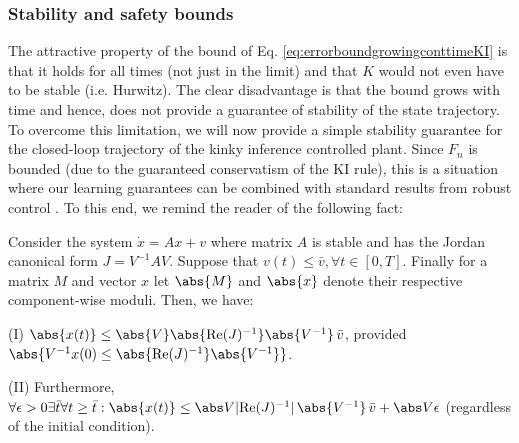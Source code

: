 \subsubsection{Stability and safety bounds}
The attractive property of the bound of Eq. \ref{eq:errorboundgrowingconttimeKI} is that it holds for all times (not just in the limit) and that $K$ would not even have to be stable (i.e. Hurwitz). The clear disadvantage is that the bound grows with time and hence, does not provide a guarantee of stability of the state trajectory. 
To overcome this limitation, we will now provide a simple stability guarantee for the closed-loop trajectory of the kinky inference controlled plant. Since $F_n$ is bounded (due to the guaranteed conservatism of the KI rule), this is a situation where our learning guarantees can be combined with  standard results from robust control \cite{Kofman2007}. To this end, we remind the reader of the following fact:

\begin{lem} \label{lem:kofman}
Consider the system $\dot x = A x + v$ where matrix $A$ is stable and has the Jordan canonical form 
$J = V^{-1} A V$. Suppose that $v(t) \leq \bar v, \forall t \in [0,T]$. Finally for a matrix $M$ and vector $x$ let $\abs{M}$ and $\abs{x}$ denote their respective component-wise moduli.
Then, we have:

 (I) $\abs{x(t)} \leq \abs{V} \abs{\text{Re}(J)^{-1}} \abs{V^{-1}} \, \bar v$, provided $\abs{V^{-1} x(0) \leq  \abs{\text{Re}(J)^{-1}} \abs{V^{-1}}}$.  

(II) Furthermore,  $\forall \epsilon >0 \exists \bar t \forall t \geq \bar t:  \abs{x(t)} \leq \abs V |\text{Re}(J)^{-1}| \, \abs{V^{-1}} \, \bar v + \abs V \epsilon $ (regardless of the initial condition). 
\end{lem}



